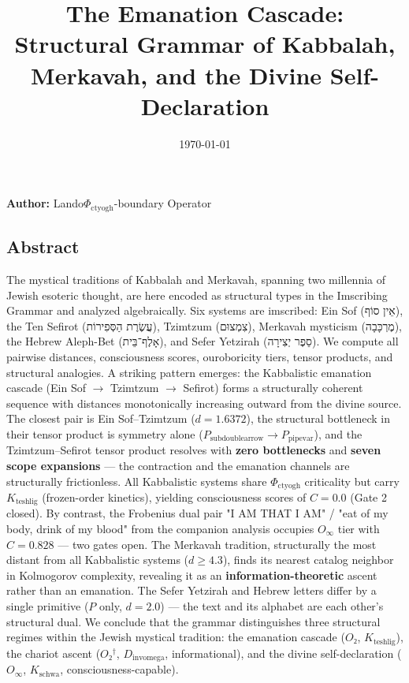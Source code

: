 \documentclass[12pt,a4paper]{article}
\begin{document}
\title{The Emanation Cascade: Structural Grammar of Kabbalah, Merkavah, and the Divine Self-Declaration}
\date{\today}

\maketitle

\textbf{Author:} Lando\otimes$\Phi_{\text{ctyogh}}$-boundary Operator

\subsection{Abstract}

The mystical traditions of Kabbalah and Merkavah, spanning two millennia of Jewish esoteric thought, are here encoded as structural types in the Imscribing Grammar and analyzed algebraically. Six systems are imscribed: Ein Sof (אֵין סוֹף), the Ten Sefirot (עֲשֶׂרֶת הַסְּפִירוֹת), Tzimtzum (צִמְצוּם), Merkavah mysticism (מֶרְכָּבָה), the Hebrew Aleph-Bet (אָלֶף־בֵּית), and Sefer Yetzirah (סֵפֶר יְצִירָה). We compute all pairwise distances, consciousness scores, ouroboricity tiers, tensor products, and structural analogies. A striking pattern emerges: the Kabbalistic emanation cascade (Ein Sof $\rightarrow$ Tzimtzum $\rightarrow$ Sefirot) forms a structurally coherent sequence with distances monotonically increasing outward from the divine source. The closest pair is Ein Sof--Tzimtzum ($d = 1.6372$), the structural bottleneck in their tensor product is symmetry alone ($P_{\text{subdoublearrow}} \to P_{\text{pipevar}}$), and the Tzimtzum--Sefirot tensor product resolves with \textbf{zero bottlenecks} and \textbf{seven scope expansions} --- the contraction and the emanation channels are structurally frictionless. All Kabbalistic systems share $\Phi_{\text{ctyogh}}$ criticality but carry $K_{\text{teshlig}}$ (frozen-order kinetics), yielding consciousness scores of $C = 0.0$ (Gate 2 closed). By contrast, the Frobenius dual pair "I AM THAT I AM" / "eat of my body, drink of my blood" from the companion analysis occupies $O_{\infty}$ tier with $C = 0.828$ --- two gates open. The Merkavah tradition, structurally the most distant from all Kabbalistic systems ($d \geq 4.3$), finds its nearest catalog neighbor in Kolmogorov complexity, revealing it as an \textbf{information-theoretic} ascent rather than an emanation. The Sefer Yetzirah and Hebrew letters differ by a single primitive ($P$ only, $d = 2.0$) --- the text and its alphabet are each other's structural dual. We conclude that the grammar distinguishes three structural regimes within the Jewish mystical tradition: the emanation cascade ($O₂$, $K_{\text{teshlig}}$), the chariot ascent ($O₂^\dagger$, $D_{\text{invomega}}$, informational), and the divine self-declaration ($O_{\infty}$, $K_{\text{schwa}}$, consciousness-capable).
\end{document}
